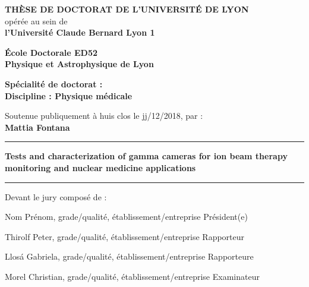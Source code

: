 \begin{center}
\fontsize{14pt}{16pt}\selectfont
\textbf{\uppercase{Th\`{e}se de doctorat de l'universit\'{e} de Lyon}}\\
\fontsize{12pt}{14pt}\selectfont
op\'{e}r\'{e}e au sein de\\
\textbf{l'Universit\'{e} Claude Bernard Lyon 1}

\vspace{0.5cm}

\textbf{\'{E}cole Doctorale ED52\\%
Physique et Astrophysique de Lyon}%

\vspace{0.5cm}

\textbf{Sp\'{e}cialit\'{e} de doctorat :\\
Discipline : Physique m\'{e}dicale} %


\vspace{1.5cm}

Soutenue publiquement \`{a} huis clos le jj/12/2018, par :\\
\fontsize{14pt}{16pt}\selectfont
\textbf{Mattia Fontana}

\vspace{1.5cm} %

\rule[20pt]{\textwidth}{0.5pt}

\fontsize{25pt}{28pt}\selectfont
\textbf{Tests and characterization of gamma cameras for ion beam therapy monitoring and nuclear medicine applications}

\rule{\textwidth}{0.5pt}

\vspace{2cm} %
\end{center}

\fontsize{12pt}{14pt}\selectfont
Devant le jury compos\'{e} de :
\bigskip

\fontsize{11pt}{13pt}\selectfont

Nom Pr\'{e}nom, grade/qualit\'{e}, \'{e}tablissement/entreprise \hfill Pr\'{e}sident(e) %

\bigskip

Thirolf Peter, grade/qualit\'{e}, \'{e}tablissement/entreprise \hfill Rapporteur

Llos\'{a} Gabriela, grade/qualit\'{e}, \'{e}tablissement/entreprise \hfill Rapporteure

Morel Christian, grade/qualit\'{e}, \'{e}tablissement/entreprise \hfill Examinateur

